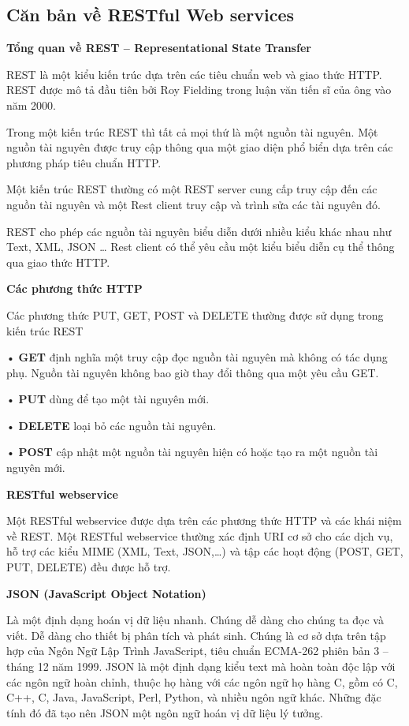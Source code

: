 \subsection{Căn bản về RESTful Web services}

\textbf{Tổng quan về REST – Representational State Transfer}

REST là một kiểu kiến trúc dựa trên các tiêu chuẩn web và giao thức HTTP. REST được mô tả đầu tiên bởi Roy Fielding trong luận văn tiến sĩ của ông vào năm 2000.

Trong một kiến trúc REST thì tất cả mọi thứ là một nguồn tài nguyên. Một nguồn tài nguyên được truy cập thông qua một giao diện phổ biển dựa trên các phương pháp tiêu chuẩn HTTP.

Một kiến trúc REST thường có một REST server cung cấp truy cập đến các nguồn tài nguyên và một Rest client truy cập và trình sửa các tài nguyên đó.

REST cho phép các nguồn tài nguyên biểu diễn dưới nhiều kiểu khác nhau như Text, XML, JSON … Rest client có thể yêu cầu một kiểu biểu diễn cụ thể thông qua giao thức HTTP.

\textbf{Các phương thức HTTP}

Các phương thức PUT, GET, POST và DELETE thường được sử dụng trong kiến trúc REST

• \textbf{GET} định nghĩa một truy cập đọc nguồn tài nguyên mà không có tác dụng phụ. Nguồn tài nguyên không bao giờ thay đổi thông qua một yêu cầu GET.

• \textbf{PUT} dùng để tạo một tài nguyên mới.

• \textbf{DELETE} loại bỏ các nguồn tài nguyên.

• \textbf{POST} cập nhật một nguồn tài nguyên hiện có hoặc tạo ra một nguồn tài nguyên mới.

\textbf{RESTful webservice}

Một RESTful webservice được dựa trên các phương thức HTTP và các khái niệm về REST. Một RESTful webservice thường xác định URI cơ sở cho các dịch vụ, hỗ trợ các kiểu MIME (XML, Text, JSON,…) và tập các hoạt động (POST, GET, PUT, DELETE) đều được hỗ trợ.

\textbf{JSON (JavaScript Object Notation)}

Là một định dạng hoán vị dữ liệu nhanh. Chúng dễ dàng cho chúng ta đọc và viết. Dễ dàng cho thiết bị phân tích và phát sinh. Chúng là cơ sở dựa trên tập hợp của Ngôn Ngữ Lập Trình JavaScript, tiêu chuẩn ECMA-262 phiên bản 3 – tháng 12 năm 1999. JSON là một định dạng kiểu text mà hoàn toàn độc lập với các ngôn ngữ hoàn chỉnh, thuộc họ hàng với các ngôn ngữ họ hàng C, gồm có C, C++, C, Java, JavaScript, Perl, Python, và nhiều ngôn ngữ khác. Những đặc tính đó đã tạo nên JSON một ngôn ngữ hoán vị dữ liệu lý tưởng.

